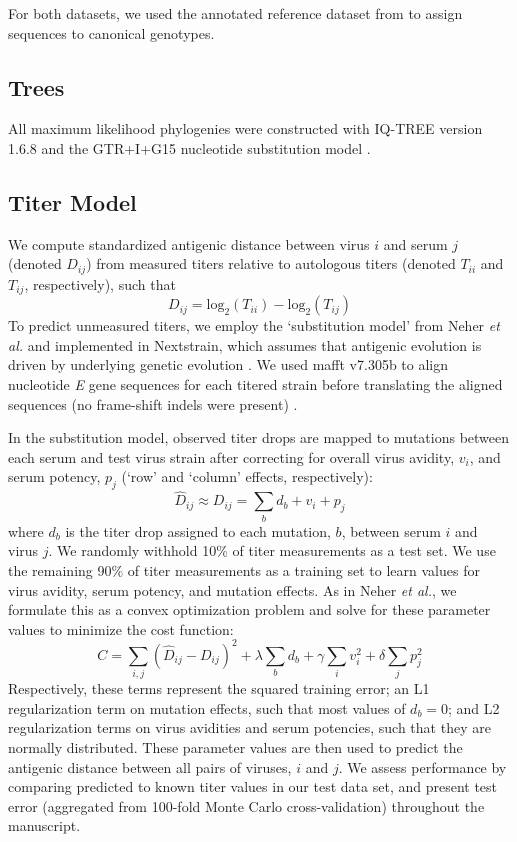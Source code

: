 \documentclass[11pt,oneside,letterpaper]{article}
\begin{document}
For both datasets, we used the annotated reference dataset from \citep{pyke2016highly} to assign sequences to canonical genotypes.

\subsection{Trees}
All maximum likelihood phylogenies were constructed with IQ-TREE version 1.6.8 and the GTR+I+G15 nucleotide substitution model \citep{nguyen2014iq}.

\subsection*{Titer Model}
We compute standardized antigenic distance between virus $i$ and serum $j$ (denoted $D_{ij}$) from measured titers relative to autologous titers (denoted $T_{ii}$ and $T_{ij}$, respectively), such that
\begin{equation}
  \label{eq_titer_norm}
D_{ij} = \mathrm{log}_2(T_{ii}) - \mathrm{log}_2(T_{ij})
\end{equation}
To predict unmeasured titers, we employ the `substitution model' from Neher \textit{et al.} and implemented in Nextstrain, which assumes that antigenic evolution is driven by underlying genetic evolution \citep{hadfield2017nextstrain,neher2016prediction}.
We used mafft v7.305b to align nucleotide \textit{E} gene sequences for each titered strain before translating the aligned sequences (no frame-shift indels were present) \citep{katoh2013mafft}.

In the substitution model, observed titer drops are mapped to mutations between each serum and test virus strain after correcting for overall virus avidity, $v_i$, and serum potency, $p_j$ (`row' and `column' effects, respectively):
\begin{equation}
  \label{eq_predicted_titers}
\hat{D}_{ij} \approx D_{ij} = \sum_{b} d_b + v_i + p_j
\end{equation}
where $d_b$ is the titer drop assigned to each mutation, $b$, between serum $i$ and virus $j$.
We randomly withhold 10\% of titer measurements as a test set.
We use the remaining 90\% of titer measurements as a training set to learn values for virus avidity, serum potency, and mutation effects.
As in Neher \textit{et al.}, we formulate this as a convex optimization problem and solve for these parameter values to minimize the cost function:
\begin{equation}
  \label{eq_cost_fn}
C = \sum_{i,j} (\hat{D}_{ij} - D_{ij})^2 + \lambda \sum_{b} d_b + \gamma \sum_{i} v_i^2 + \delta \sum_{j} p_j^2
\end{equation}
Respectively, these terms represent the squared training error; an L1 regularization term on mutation effects, such that most values of $d_b = 0$; and L2 regularization terms on virus avidities and serum potencies, such that they are normally distributed.
These parameter values are then used to predict the antigenic distance between all pairs of viruses, $i$ and $j$.
We assess performance by comparing predicted to known titer values in our test data set, and present test error (aggregated from 100-fold Monte Carlo cross-validation) throughout the manuscript.
\end{document}
